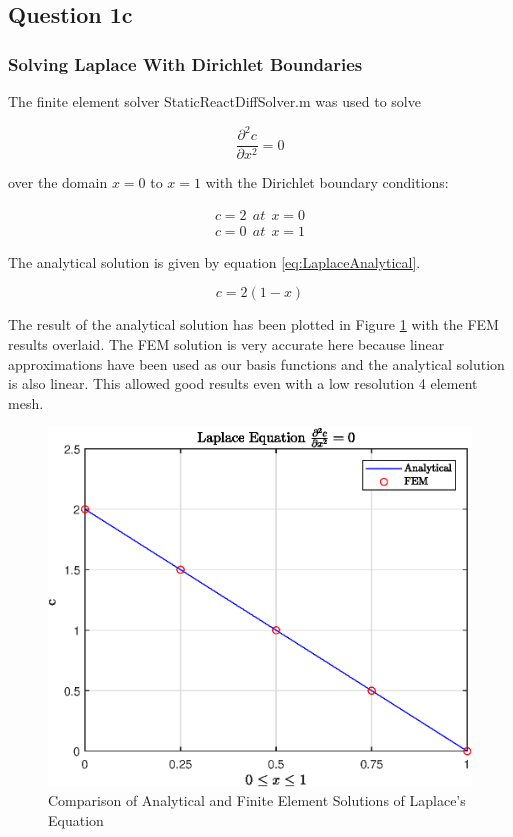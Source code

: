 \documentclass[11pt]{article}
\begin{document}
\subsection{Question 1c}
\subsubsection{Solving Laplace With Dirichlet Boundaries}

The finite element solver StaticReactDiffSolver.m  was used to solve

\begin{equation}
\label{eq:Laplace}
\frac{\partial^2 c}{\partial x^2} = 0
\end{equation}

over the domain $x = 0$ to $x = 1$ with the Dirichlet boundary conditions:

\begin{subequations}\label{eq:LaplaceBCs}
\begin{align}
c = 2 \ \ at \ \ x = 0 \\
c = 0 \ \ at \ \ x  = 1
\end{align}
\end{subequations}

The analytical solution is given by equation \ref{eq:LaplaceAnalytical}.

\begin{equation}\label{eq:LaplaceAnalytical}
c = 2(1-x)
\end{equation}

The result of the analytical solution has been plotted in Figure \ref{fig:LaplaceFig1} with the FEM results overlaid. The FEM solution is very accurate here because linear approximations have been used as our basis functions and the analytical solution is also linear. This allowed good results even with a low resolution 4 element mesh.

\begin{figure}[h!] 
    \centering
    \includegraphics{epsLaplaceFig1}
    \caption{Comparison of Analytical and Finite Element Solutions of Laplace's Equation}\label{fig:LaplaceFig1}
\end{figure}
\end{document}
